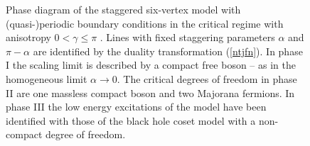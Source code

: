 \documentclass{article}
\begin{document}
\begin{figure}[h]
    \centering
    \caption{Phase diagram of the staggered six-vertex model with (quasi-)periodic boundary conditions in the critical regime with anisotropy $0 < \gamma \leq \pi$ \cite{FrMa12,KoLu23}. Lines with fixed staggering parameters $\alpha$ and $\pi - \alpha$ are identified by the duality transformation (\ref{ntjfn}). In phase I the scaling limit is described by a compact free boson -- as in the homogeneous limit $\alpha \to 0$. The critical degrees of freedom in phase II are one massless compact boson and two Majorana fermions. In phase III the low energy excitations of the model have been identified with those of the black hole coset model with a non-compact degree of freedom.}
    \label{fig:phase_diagram}
\end{figure}
\end{document}
